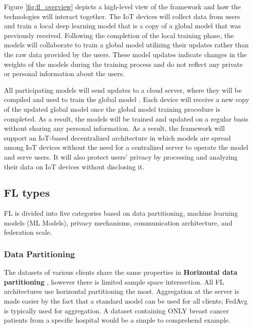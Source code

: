 Figure \ref{fig:fl_overview} depicts a high-level view of the framework and how the technologies will interact together. The IoT devices will collect data from users and train a local deep learning model that is a copy of a global model that was previously received. Following the completion of the local training phase, the models will collaborate to train a global model utilizing their updates rather than the raw data provided by the users. These model updates indicate changes in the weights of the models during the training process and do not reflect any private or personal information about the users.

All participating models will send updates to a cloud server, where they will be compiled and used to train the global model \cite{fl2} \cite{fl3}. Each device will receive a new copy of the updated global model once the global model training procedure is completed. As a result, the models will be trained and updated on a regular basis without sharing any personal information. As a result, the framework will support an IoT-based decentralized architecture in which models are spread among IoT devices without the need for a centralized server to operate the model and serve users. It will also protect users' privacy by processing and analyzing their data on IoT devices without disclosing it.

\subsection{FL types}

FL is divided into five categories \cite{fl26_types} based on data partitioning, machine learning models (ML Models), privacy mechanisms, communication architecture, and federation scale.

\subsubsection{Data Partitioning}

The datasets of various clients share the same properties in \textbf{Horizontal data partitioning} \cite{fl25}, however there is limited sample space intersection. All FL architectures use horizontal partitioning the most. Aggregation at the server is made easier by the fact that a standard model can be used for all clients; FedAvg is typically used for aggregation. A dataset containing ONLY breast cancer patients from a specific hospital would be a simple to comprehend example. 

